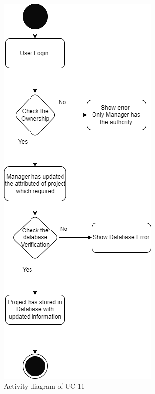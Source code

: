 \begin{figure}[H]
    \centering
    \includegraphics[scale=0.7]{./diagrams/Activity Diagram/ad-11.png}
    \caption{Activity diagram of UC-11}
    \label{fig:act-11}

\end{figure}


